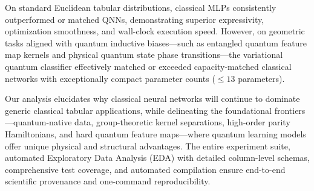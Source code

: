 On standard Euclidean tabular distributions, classical MLPs consistently outperformed or matched QNNs, demonstrating superior expressivity, optimization smoothness, and wall-clock execution speed. However, on geometric tasks aligned with quantum inductive biases---such as entangled quantum feature map kernels and physical quantum state phase transitions---the variational quantum classifier effectively matched or exceeded capacity-matched classical networks with exceptionally compact parameter counts ($\le 13$ parameters).

Our analysis elucidates why classical neural networks will continue to dominate generic classical tabular applications, while delineating the foundational frontiers---quantum-native data, group-theoretic kernel separations, high-order parity Hamiltonians, and hard quantum feature maps---where quantum learning models offer unique physical and structural advantages. The entire experiment suite, automated Exploratory Data Analysis (EDA) with detailed column-level schemas, comprehensive test coverage, and automated compilation ensure end-to-end scientific provenance and one-command reproducibility.

